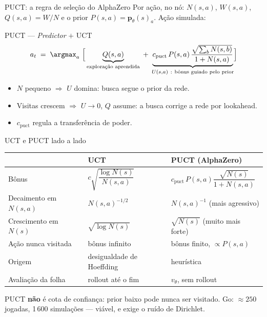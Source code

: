 \documentclass[aspectratio=169, 10pt]{beamer}
\newcommand{\cpuct}{c_{\mathrm{puct}}}
\newcommand{\Nvis}{N}
\newcommand{\Wtot}{W}
\newcommand{\redeval}{v_{\theta}}
\newcommand{\redepol}{\bm{p}_{\theta}}
\begin{document}
\begin{frame}{PUCT: a regra de seleção do AlphaZero}
  \small
  Por ação, no nó: $\Nvis(s,a)$, $\Wtot(s,a)$, $Q(s,a)=\Wtot/\Nvis$ e o prior $P(s,a) = \redepol(s)_a$. Ação simulada:

  \begin{teobox}{PUCT --- \emph{Predictor} $+$ UCT}
    \[
      a_t \;=\; \argmax_{a}\ \Bigl[\, \underbrace{Q(s,a)}_{\text{exploração aprendida}}
      \;+\; \underbrace{\cpuct\, P(s,a)\,\frac{\sqrt{\sum_b \Nvis(s,b)}}{1+\Nvis(s,a)}}_{U(s,a)\ :\ \text{bônus guiado pelo prior}} \Bigr]
    \]
  \end{teobox}

  \begin{itemize}
    \item $\Nvis$ pequeno $\Rightarrow$ $U$ domina: busca segue o \alert{prior da rede}.
    \item Visitas crescem $\Rightarrow$ $U \to 0$, $Q$ assume: a busca \alert{corrige} a rede por lookahead.
    \item $\cpuct$ regula a transferência de poder.
  \end{itemize}
\end{frame}

\begin{frame}{UCT e PUCT lado a lado}
  \small
  \begin{center}
  \begin{tabular}{lll}
    \toprule
     & \textbf{UCT} & \textbf{PUCT (AlphaZero)} \\
    \midrule
    Bônus & $c\sqrt{\dfrac{\log \Nvis(s)}{\Nvis(s,a)}}$ & $\cpuct\,P(s,a)\dfrac{\sqrt{\Nvis(s)}}{1+\Nvis(s,a)}$ \\[1.1em]
    Decaimento em $\Nvis(s,a)$ & $\Nvis(s,a)^{-1/2}$ & $\Nvis(s,a)^{-1}$ (mais agressivo) \\
    Crescimento em $\Nvis(s)$ & $\sqrt{\log \Nvis(s)}$ & $\sqrt{\Nvis(s)}$ (muito mais forte) \\
    Ação nunca visitada & bônus infinito & bônus finito, $\propto P(s,a)$ \\
    Origem & desigualdade de Hoeffding & \alert{heurística} \\
    Avaliação da folha & rollout até o fim & $\redeval$, sem rollout \\
    \bottomrule
  \end{tabular}
  \end{center}

  \begin{alertabox}
    PUCT \textbf{não} é cota de confiança: prior baixo pode nunca ser visitado. Go: $\approx 250$ jogadas, 1\,600 simulações — viável, e exige o ruído de Dirichlet.
  \end{alertabox}
\end{frame}
\end{document}
